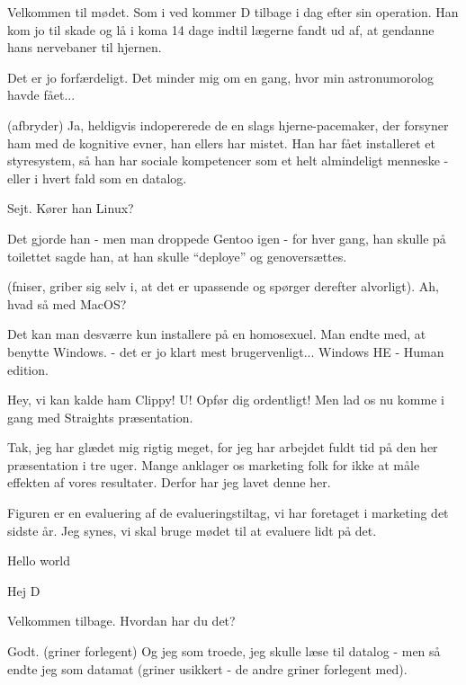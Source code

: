 \documentclass[a4paper,11pt]{article}
\begin{document}
\begin{sketch}

  Velkommen til mødet. Som i ved kommer D tilbage i dag efter sin operation. Han kom jo til skade og lå i koma 14 dage indtil lægerne fandt ud af, at gendanne hans nervebaner til hjernen.

 Det er jo forfærdeligt. Det minder mig om en gang, hvor min astronumorolog havde fået...

(afbryder) Ja, heldigvis indopererede de en slags hjerne-pacemaker, der forsyner ham med de kognitive evner, han ellers har mistet. Han har fået installeret et styresystem, så han har sociale kompetencer som et helt almindeligt menneske - eller i hvert fald som en datalog.

 Sejt. Kører han Linux?

 Det gjorde han - men man droppede Gentoo igen - for hver gang, han skulle på toilettet sagde han, at han skulle “deploye” og genoversættes.

(fniser, griber sig selv i, at det er upassende og spørger derefter alvorligt). Ah, hvad så med MacOS?

Det kan man desværre kun installere på en homosexuel. Man endte med, at benytte Windows. - det er jo klart mest brugervenligt... Windows HE - Human edition.

Hey, vi kan kalde ham Clippy!
U! Opfør dig ordentligt! Men lad os nu komme i gang med Straights præsentation.

Tak, jeg har glædet mig rigtig meget, for jeg har arbejdet fuldt tid på den her præsentation i tre uger. Mange anklager os marketing folk for ikke at måle effekten af vores resultater. Derfor har jeg lavet denne her.


Figuren er en evaluering af de evalueringstiltag, vi har foretaget i marketing det sidste år. Jeg synes, vi skal bruge mødet til at evaluere lidt på det.



 Hello world

 Hej D

 Velkommen tilbage. Hvordan har du det?

 Godt. (griner forlegent) Og jeg som troede, jeg skulle læse til datalog - men så endte jeg som datamat (griner usikkert - de andre griner forlegent med).


\end{sketch}
\end{document}
